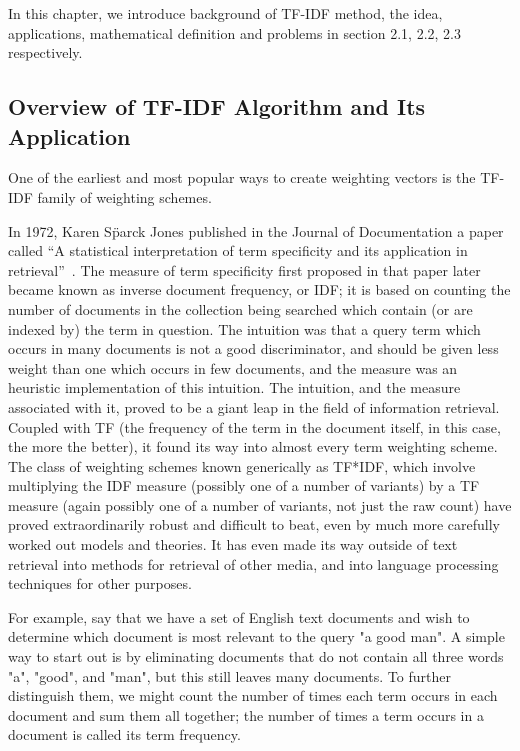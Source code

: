 In this chapter, we introduce background of TF-IDF method, the idea, applications, mathematical definition and problems in section 2.1, 2.2, 2.3 respectively.  

\clearpage
\subsection{Overview of TF-IDF Algorithm and Its Application}\label{sec:bg_intro}


One of the earliest and most popular ways to create weighting vectors is the TF-IDF family of weighting schemes.  

In 1972, Karen Sp̈arck Jones published in the Journal of Documentation a paper called ``A statistical interpretation of term specificity and its application in retrieval''~\cite{Jones72astatistical}. The measure of term specificity first proposed in that paper later became known as inverse document frequency, or IDF; it is based on counting the number of documents in the collection being searched which contain (or are indexed by) the term in question. The intuition was that a query term which occurs in many documents is not a good discriminator, and should be given less weight than one which occurs in few documents, and the measure was an heuristic implementation of this intuition.
The intuition, and the measure associated with it, proved to be a giant leap in the field of information retrieval. Coupled with TF (the frequency of the term in the document itself, in this case, the more the better), it found its way into almost every term weighting scheme.
The class of weighting schemes known generically as TF*IDF, which involve multiplying the IDF measure (possibly one of a number of variants) by a TF measure (again possibly one of a number of variants, not just the raw count) have proved extraordinarily robust and difficult to beat, even by much more carefully worked out models and theories. It has even made its way outside of text retrieval into methods for retrieval of other media, and into language processing techniques for other purposes.

For example, say that we have a set of English text documents and wish to determine which document is most relevant to the query "a good man". A simple way to start out is by eliminating documents that do not contain all three words "a", "good", and "man", but this still leaves many documents. To further distinguish them, we might count the number of times each term occurs in each document and sum them all together; the number of times a term occurs in a document is called its term frequency.

